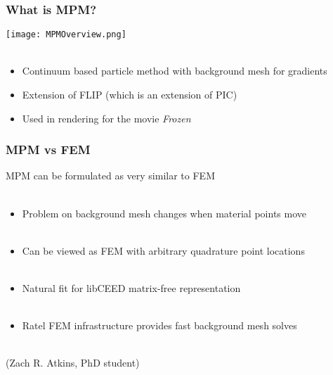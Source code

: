 \documentclass{beamer}
\begin{document}
\begin{frame}
\begin{center}
\frametitle{What is MPM?}

\texttt{[image: MPMOverview.png]}\\

~\\

\begin{itemize}

\item Continuum based particle method with background mesh for gradients\\

\item Extension of FLIP (which is an extension of PIC)\\

\item Used in rendering for the movie \emph{Frozen}\\

\end{itemize}

\end{center}
\end{frame}


\begin{frame}
\begin{center}
\frametitle{MPM vs FEM}

MPM can be formulated as very similar to FEM\\

~\\

\begin{itemize}

\item Problem on background mesh changes when material points move\\

~\\

\item Can be viewed as FEM with arbitrary quadrature point locations\\

~\\

\item Natural fit for libCEED matrix-free representation\\

~\\

\item Ratel FEM infrastructure provides fast background mesh solves\\

\end{itemize}

~\\

(Zach R. Atkins, PhD student)

\end{center}
\end{frame}
\end{document}
